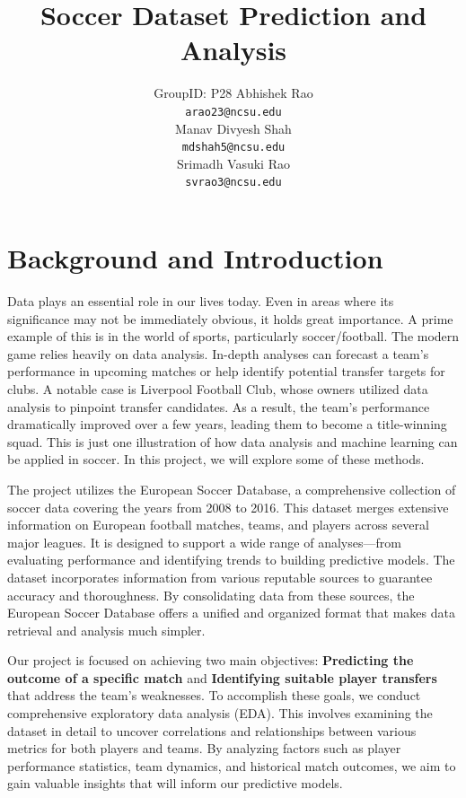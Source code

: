 \documentclass{article}
\begin{document}
\title{Soccer Dataset Prediction and Analysis}

\author{%
    GroupID: P28
    \AND
  Abhishek Rao \\
  \texttt{arao23@ncsu.edu} \\
  \And
  Manav Divyesh Shah \\
  \texttt{mdshah5@ncsu.edu} \\
  \And
  Srimadh Vasuki Rao \\
  \texttt{svrao3@ncsu.edu}
}

\maketitle


\section{Background and Introduction}
\label{gen_inst}
Data plays an essential role in our lives today. Even in areas where its significance may not be immediately obvious, it holds great importance. A prime example of this is in the world of sports, particularly soccer/football. The modern game relies heavily on data analysis. In-depth analyses can forecast a team's performance in upcoming matches or help identify potential transfer targets for clubs. A notable case is Liverpool Football Club, whose owners utilized data analysis to pinpoint transfer candidates. As a result, the team's performance dramatically improved over a few years, leading them to become a title-winning squad. This is just one illustration of how data analysis and machine learning can be applied in soccer. In this project, we will explore some of these methods.

The project utilizes the European Soccer Database, a comprehensive collection of soccer data covering the years from 2008 to 2016. This dataset merges extensive information on European football matches, teams, and players across several major leagues. It is designed to support a wide range of analyses—from evaluating performance and identifying trends to building predictive models. The dataset incorporates information from various reputable sources to guarantee accuracy and thoroughness. By consolidating data from these sources, the European Soccer Database offers a unified and organized format that makes data retrieval and analysis much simpler.

Our project is focused on achieving two main objectives: \textbf{Predicting the outcome of a specific match} and \textbf{Identifying suitable player transfers} that address the team's weaknesses. To accomplish these goals, we conduct comprehensive exploratory data analysis (EDA). This involves examining the dataset in detail to uncover correlations and relationships between various metrics for both players and teams. By analyzing factors such as player performance statistics, team dynamics, and historical match outcomes, we aim to gain valuable insights that will inform our predictive models.
\end{document}
